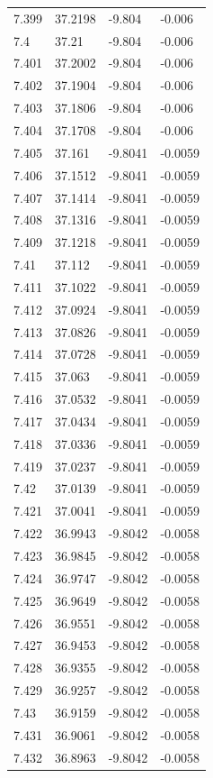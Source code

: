 \begin{tabular}{llll}
7.399 & 37.2198 & -9.804 & -0.006 \\
7.4 & 37.21 & -9.804 & -0.006 \\
7.401 & 37.2002 & -9.804 & -0.006 \\
7.402 & 37.1904 & -9.804 & -0.006 \\
7.403 & 37.1806 & -9.804 & -0.006 \\
7.404 & 37.1708 & -9.804 & -0.006 \\
7.405 & 37.161 & -9.8041 & -0.0059 \\
7.406 & 37.1512 & -9.8041 & -0.0059 \\
7.407 & 37.1414 & -9.8041 & -0.0059 \\
7.408 & 37.1316 & -9.8041 & -0.0059 \\
7.409 & 37.1218 & -9.8041 & -0.0059 \\
7.41 & 37.112 & -9.8041 & -0.0059 \\
7.411 & 37.1022 & -9.8041 & -0.0059 \\
7.412 & 37.0924 & -9.8041 & -0.0059 \\
7.413 & 37.0826 & -9.8041 & -0.0059 \\
7.414 & 37.0728 & -9.8041 & -0.0059 \\
7.415 & 37.063 & -9.8041 & -0.0059 \\
7.416 & 37.0532 & -9.8041 & -0.0059 \\
7.417 & 37.0434 & -9.8041 & -0.0059 \\
7.418 & 37.0336 & -9.8041 & -0.0059 \\
7.419 & 37.0237 & -9.8041 & -0.0059 \\
7.42 & 37.0139 & -9.8041 & -0.0059 \\
7.421 & 37.0041 & -9.8041 & -0.0059 \\
7.422 & 36.9943 & -9.8042 & -0.0058 \\
7.423 & 36.9845 & -9.8042 & -0.0058 \\
7.424 & 36.9747 & -9.8042 & -0.0058 \\
7.425 & 36.9649 & -9.8042 & -0.0058 \\
7.426 & 36.9551 & -9.8042 & -0.0058 \\
7.427 & 36.9453 & -9.8042 & -0.0058 \\
7.428 & 36.9355 & -9.8042 & -0.0058 \\
7.429 & 36.9257 & -9.8042 & -0.0058 \\
7.43 & 36.9159 & -9.8042 & -0.0058 \\
7.431 & 36.9061 & -9.8042 & -0.0058 \\
7.432 & 36.8963 & -9.8042 & -0.0058 \\

\end{tabular}
